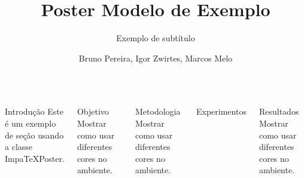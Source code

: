 \documentclass[palette=basic,mode=light]{impaTeXPoster}
\title{Poster Modelo de Exemplo}
\subtitle{Exemplo de subtítulo}
\author{Bruno Pereira, Igor Zwirtes, Marcos Melo}
\begin{document}
\leftlogosize{20cm}{20cm}
\rightlogosize{15cm}{10cm}

\maketitle


\begin{columns}


\begin{postercard}{Introdução}
Este é um exemplo de seção usando a classe ImpaTeXPoster.
\lipsum[1]
\lipsum[1]
\end{postercard}


\begin{postercard}{Objetivo}
Mostrar como usar diferentes cores no ambiente.

\lipsum[2]
\end{postercard}

\begin{postercard}{Metodologia}
Mostrar como usar diferentes cores no ambiente.

\lipsum[2]
\end{postercard}


\begin{postercard}{Experimentos}
\lipsum[1]
\end{postercard}



\begin{postercard}{Resultados}
Mostrar como usar diferentes cores no ambiente.

\lipsum[2]
\lipsum[1]
\lipsum[3]
\end{postercard}

\end{columns}
\end{document}
